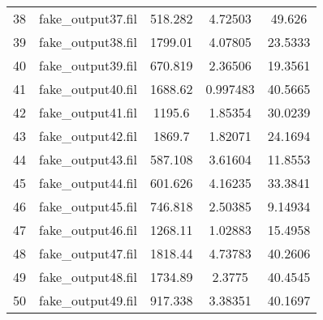 \begin{sidewaystable}
\begin{minipage}{0.5\textheight}
\begin{tabular}{ccccc}
          38       & fake\_output37.fil &    518.282    & 4.72503  & 49.626  \\
          39       & fake\_output38.fil &    1799.01    & 4.07805  & 23.5333 \\
          40       & fake\_output39.fil &    670.819    & 2.36506  & 19.3561 \\
          41       & fake\_output40.fil &    1688.62    & 0.997483 & 40.5665 \\
          42       & fake\_output41.fil &    1195.6     & 1.85354  & 30.0239 \\
          43       & fake\_output42.fil &    1869.7     & 1.82071  & 24.1694 \\
          44       & fake\_output43.fil &    587.108    & 3.61604  & 11.8553 \\
          45       & fake\_output44.fil &    601.626    & 4.16235  & 33.3841 \\
          46       & fake\_output45.fil &    746.818    & 2.50385  & 9.14934 \\
          47       & fake\_output46.fil &    1268.11    & 1.02883  & 15.4958 \\
          48       & fake\_output47.fil &    1818.44    & 4.73783  & 40.2606 \\
          49       & fake\_output48.fil &    1734.89    &  2.3775  & 40.4545 \\
          50       & fake\_output49.fil &    917.338    & 3.38351  & 40.1697 \\
        \hline
    \end{tabular}
    \end{minipage}
    \label{tab:fakedata}
\end{sidewaystable}